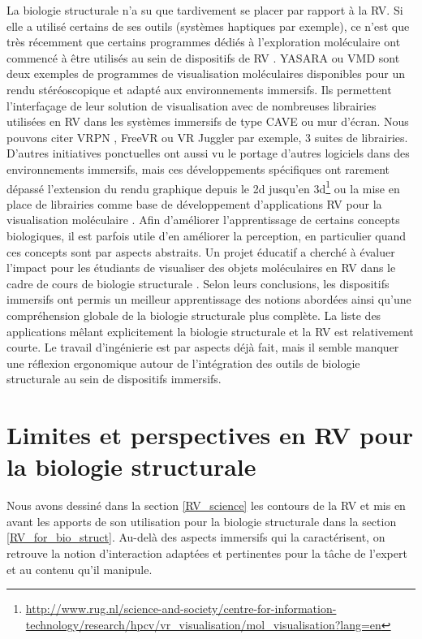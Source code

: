 La biologie structurale n'a su que tardivement se placer par rapport à la RV. Si elle a utilisé certains de ses outils (systèmes haptiques par exemple), ce n'est que très récemment que certains programmes dédiés à l'exploration moléculaire ont commencé à être utilisés au sein de dispositifs de RV \cite{odonoghue_visualization_2010}. YASARA \cite{krieger2014yasara} ou VMD \cite{stone_immersive_2010} sont deux exemples de programmes de visualisation moléculaires disponibles pour un rendu stéréoscopique et adapté aux environnements immersifs. Ils permettent l'interfaçage de leur solution de visualisation avec de nombreuses librairies utilisées en RV dans les systèmes immersifs de type CAVE ou mur d'écran. Nous pouvons citer VRPN \cite{taylor2001vrpn}, FreeVR \cite{pape2004commodity} ou VR Juggler par exemple, 3 suites de librairies. 
D'autres initiatives ponctuelles ont aussi vu le portage d'autres logiciels dans des environnements immersifs, mais ces développements spécifiques ont rarement dépassé l'extension du rendu graphique depuis le 2d jusqu'en 3d\footnote{\url{http://www.rug.nl/science-and-society/centre-for-information-technology/research/hpcv/vr\_visualisation/mol\_visualisation?lang=en}} ou la mise en place de librairies comme base de développement d'applications RV pour la visualisation moléculaire \cite{salvadori_moka:_2014}.  Afin d'améliorer l'apprentissage de certains concepts biologiques, il est parfois utile d'en améliorer la perception, en particulier quand ces concepts sont par aspects abstraits. Un projet éducatif a cherché à évaluer l'impact pour les étudiants de visualiser des objets moléculaires en RV dans le cadre de cours de biologie structurale \cite{tan_use_2013}. Selon leurs conclusions, les dispositifs immersifs ont permis un meilleur apprentissage des notions abordées ainsi qu'une compréhension globale de la biologie structurale plus complète.
La liste des applications mêlant explicitement la biologie structurale et la RV est relativement courte. Le travail d'ingénierie est par aspects déjà fait, mais il semble manquer une réflexion ergonomique autour de l'intégration des outils de biologie structurale au sein de dispositifs immersifs.


\section{Limites et perspectives en RV pour la biologie structurale} %
\label{sec:RV_perspectives}

Nous avons dessiné dans la section \ref{RV_science} les contours de la RV et mis en avant les apports de son utilisation pour la biologie structurale dans la section \ref{RV_for_bio_struct}. Au-delà des aspects immersifs qui la caractérisent, on retrouve la notion d'interaction adaptées et pertinentes pour la tâche de l'expert et au contenu qu'il manipule.

